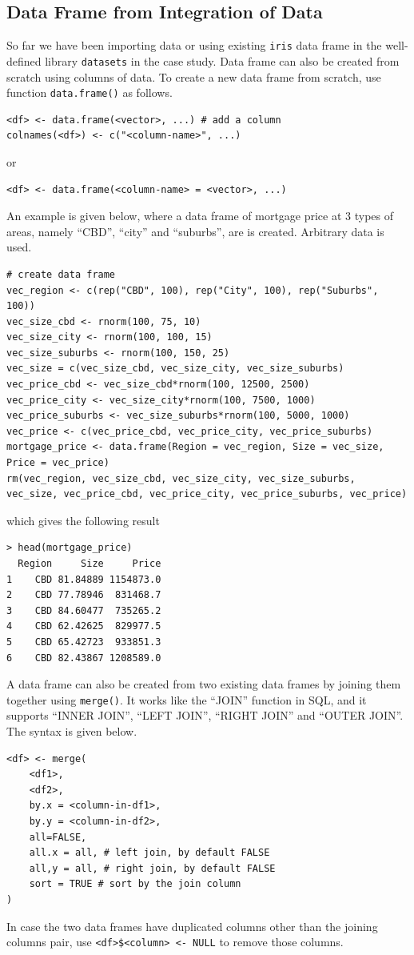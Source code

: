 \subsection{Data Frame from Integration of Data} \label{subsec:df-integration-of-data}

So far we have been importing data or using existing \verb|iris| data frame in the well-defined library \verb|datasets| in the case study. Data frame can also be created from scratch using columns of data. To create a new data frame from scratch, use function \verb|data.frame()| as follows.
\begin{lstlisting}
<df> <- data.frame(<vector>, ...) # add a column
colnames(<df>) <- c("<column-name>", ...)
\end{lstlisting}
or
\begin{lstlisting}
<df> <- data.frame(<column-name> = <vector>, ...)
\end{lstlisting}

An example is given below, where a data frame of mortgage price at 3 types of areas, namely ``CBD'', ``city'' and ``suburbs'', are is created. Arbitrary data is used.
\begin{lstlisting}
# create data frame
vec_region <- c(rep("CBD", 100), rep("City", 100), rep("Suburbs", 100))
vec_size_cbd <- rnorm(100, 75, 10)
vec_size_city <- rnorm(100, 100, 15)
vec_size_suburbs <- rnorm(100, 150, 25)
vec_size = c(vec_size_cbd, vec_size_city, vec_size_suburbs)
vec_price_cbd <- vec_size_cbd*rnorm(100, 12500, 2500)
vec_price_city <- vec_size_city*rnorm(100, 7500, 1000)
vec_price_suburbs <- vec_size_suburbs*rnorm(100, 5000, 1000)
vec_price <- c(vec_price_cbd, vec_price_city, vec_price_suburbs)
mortgage_price <- data.frame(Region = vec_region, Size = vec_size, Price = vec_price)
rm(vec_region, vec_size_cbd, vec_size_city, vec_size_suburbs, vec_size, vec_price_cbd, vec_price_city, vec_price_suburbs, vec_price)
\end{lstlisting}
which gives the following result
\begin{lstlisting}
> head(mortgage_price)
  Region     Size     Price
1    CBD 81.84889 1154873.0
2    CBD 77.78946  831468.7
3    CBD 84.60477  735265.2
4    CBD 62.42625  829977.5
5    CBD 65.42723  933851.3
6    CBD 82.43867 1208589.0
\end{lstlisting}

A data frame can also be created from two existing data frames by joining them together using \verb|merge()|. It works like the ``JOIN'' function in SQL, and it supports ``INNER JOIN'', ``LEFT JOIN'', ``RIGHT JOIN'' and ``OUTER JOIN''. The syntax is given below.
\begin{lstlisting}
<df> <- merge(
    <df1>,
    <df2>,
    by.x = <column-in-df1>,
    by.y = <column-in-df2>,
    all=FALSE,
    all.x = all, # left join, by default FALSE
    all,y = all, # right join, by default FALSE
    sort = TRUE # sort by the join column
)
\end{lstlisting}
In case the two data frames have duplicated columns other than the joining columns pair, use \verb|<df>$<column> <- NULL| to remove those columns.

